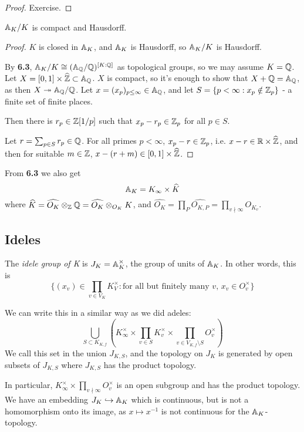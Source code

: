 \documentclass[10pt,a4paper]{article}
\begin{document}
\begin{proof}
  Exercise.
\end{proof}
\begin{theorem}
  $\mathbb{A}_K/K$ is compact and Hausdorff.
\end{theorem}
\begin{proof}
  $K$ is closed in $\mathbb{A}_K$, and $\mathbb{A}_K$ is Hausdorff, so $\mathbb{A}_K/K$ is Hausdorff.

  By \textbf{6.3}, $\mathbb{A}_K/K \cong (\mathbb{A}_{\mathbb{Q}}/\mathbb{Q})^{[K:\mathbb{Q}]}$ as topological groups, so we may assume $K = \mathbb{Q}$. Let $X = [0,1]\times \widehat{\mathbb{Z}} \subset \mathbb{A}_{\mathbb{Q}}$. $X$ is compact, so it's enough to show that $X+ \mathbb{Q} = \mathbb{A}_{\mathbb{Q}}$, as then $X \twoheadrightarrow \mathbb{A}_{\mathbb{Q}}/\mathbb{Q}$. Let $x = (x_p)_{p\leq \infty} \in \mathbb{A}_{\mathbb{Q}}$, and let $S = \{p<\infty : x_p \notin \mathbb{Z}_p\}$ - a finite set of finite places.

  Then there is $r_p \in \mathbb{Z}[1/p]$ such that $x_p -r_p \in \mathbb{Z}_p$ for all $p \in S$.

  Let $r = \sum_{p \in S}r_p \in \mathbb{Q}$. For all primes $p < \infty$, $x_p - r \in \mathbb{Z}_p$, i.e. $x-r \in \mathbb{R} \times \widehat{\mathbb{Z}}$, and then for suitable $m \in \mathbb{Z}$, $x-(r+m) \in [0,1]\times \widehat{\mathbb{Z}}$.
\end{proof}
From \textbf{6.3} we also get
\[\mathbb{A}_K = K_\infty \times \widehat{K}\]
where $\widehat{K} = \widehat{O_K} \otimes_{\mathbb{Z}} \mathbb{Q} = \widehat{O_K} \otimes_{O_K} K$, and $\hat{O_K} = \prod_{P}\hat{O_{K,P}} =\prod_{v\nmid \infty}O_{K_v}$.

\subsection{Ideles}
\begin{definition}
  The \emph{idele group of K} is $J_K = \mathbb{A}_K^\times$, the group of units of $\mathbb{A}_K$. In other words, this is
  \[\{(x_v) \in \prod_{v\in V_K}K_V^\times : \text{for all but finitely many $v$, $x_v \in O_v^\times$}\}\]
\end{definition}
We can write this in a similar way as we did adeles:
\[\bigcup_{S \subset K_{K,f}}\left(K_\infty^\times \times \prod_{v\in S}K_v^\times \times \prod_{v \in V_{K,f}\setminus S}O_v^\times\right)\]
We call this set in the union $J_{K,S}$, and the topology on $J_K$ is generated by open subsets of $J_{K,S}$ where $J_{K,S}$ has the product topology.

In particular, $K_\infty^\times \times \prod_{v\nmid \infty}O_v^\times$ is an open subgroup and has the product topology. We have an embedding $J_K \hookrightarrow \mathbb{A}_K$ which is continuous, but is not a homomorphism onto its image, as $x \mapsto x^{-1}$ is not continuous for the $\mathbb{A}_K$-topology.
\end{document}
